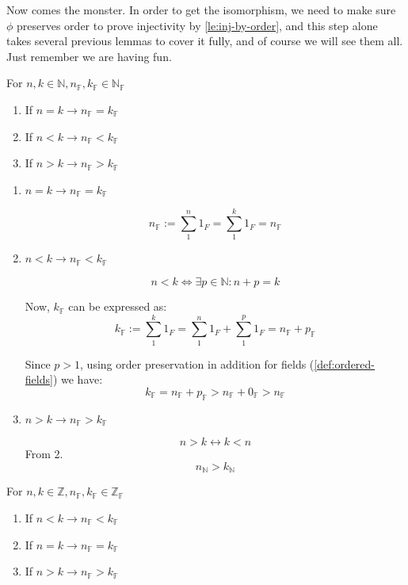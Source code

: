 Now comes the monster. In order to get the isomorphism, we need to make sure $\phi$ preserves order to prove injectivity by \cref{le:inj-by-order}, and this step alone takes several previous lemmas to cover it fully, and of course we will see them all. Just remember we are having fun.

\begin{lemma}
For $n, k \in \mathbb{N}, n_\mathbb{F}, k_\mathbb{F} \in \mathbb{N_F}$
\begin{enumerate}
\item If $n = k \rightarrow n_\mathbb{F}= k_\mathbb{F}$
\item If $n < k \rightarrow n_\mathbb{F}< k_\mathbb{F}$
\item If $n > k \rightarrow n_\mathbb{F}> k_\mathbb{F}$
\end{enumerate}
\end{lemma}

\begin{bookproof}
\begin{enumerate}
\item $n = k \rightarrow n_\mathbb{F} = k_\mathbb{F}$

$$n_\mathbb{F} := \sum_{1}^{n}{1_F} = \sum_{1}^{k}{1_F} = n_\mathbb{F}$$

\item $n < k \rightarrow n_\mathbb{F} < k_\mathbb{F}$

$$n < k \Leftrightarrow \exists p \in \mathbb{N}: n + p = k$$

Now, $k_\mathbb{F}$ can be expressed as:
$$k_\mathbb{F} := \sum_{1}^{k}{1_F} = \sum_{1}^{n}{1_F} + \sum_{1}^{p}{1_F}  = n_\mathbb{F} + p_\mathbb{F}$$

Since $p > 1$, using order preservation in addition for fields (\cref{def:ordered-fields}) we have:
$$k_\mathbb{F} = n_\mathbb{F} + p_\mathbb{F} > n_\mathbb{F} + 0_\mathbb{F} > n_\mathbb{F}$$

\item $n > k \rightarrow n_\mathbb{F} > k_\mathbb{F}$

$$n > k \leftrightarrow k < n$$
From 2.
$$n_\mathbb{N} > k_\mathbb{N} $$
\end{enumerate}
\end{bookproof}

\begin{lemma}\label{le:ordering-Z}
For $n, k \in \mathbb{Z}, n_\mathbb{F}, k_\mathbb{F} \in \mathbb{Z_F}$
\begin{enumerate}
\item If $n < k \rightarrow n_\mathbb{F}< k_\mathbb{F}$
\item If $n = k \rightarrow n_\mathbb{F}= k_\mathbb{F}$
\item If $n > k \rightarrow n_\mathbb{F}> k_\mathbb{F}$
\end{enumerate}
\end{lemma}

